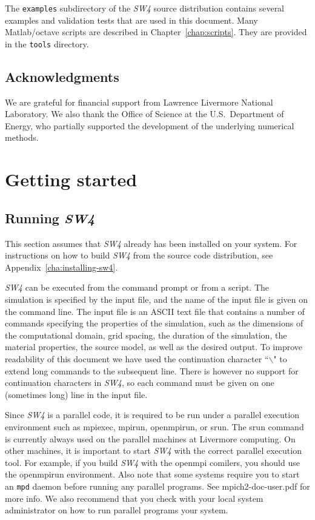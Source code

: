 \documentclass[11pt]{report}
\begin{document}
The {\tt examples} subdirectory of the \emph{SW4} source distribution contains several examples and
validation tests that are used in this document. Many Matlab/octave scripts are described in
Chapter~\ref{chap:scripts}. They are provided in the {\tt tools} directory.

\section*{Acknowledgments} 
We are grateful for financial support from Lawrence Livermore National Laboratory. We also thank
the Office of Science at the U.S.~Department of Energy, who partially supported the development of
the underlying numerical methods.

\chapter{Getting started}

\section{Running \emph{SW4}}
This section assumes that \emph{SW4} already has been installed on your system. For instructions on
how to build \emph{SW4} from the source code distribution, see Appendix~\ref{cha:installing-sw4}.

\emph{SW4} can be executed from the command prompt or from a script. The simulation is specified by
the input file, and the name of the input file is given on the command line. The input file is an
ASCII text file that contains a number of commands specifying the properties of the simulation, such
as the dimensions of the computational domain, grid spacing, the duration of the simulation, the
material properties, the source model, as well as the desired output. To improve readability of this
document we have used the continuation character ``$\backslash$" to extend long commands to the
subsequent line. There is however no support for continuation characters in \emph{SW4}, so each
command must be given on one (sometimes long) line in the input file.

Since \emph{SW4} is a parallel code, it is required to be run under a parallel execution environment
such as mpiexec, mpirun, openmpirun, or srun. The srun command is currently always used on the
parallel machines at Livermore computing. On other machines, it is important to start \emph{SW4}
with the correct parallel execution tool. For example, if you build \emph{SW4} with the openmpi
comilers, you should use the openmpirun environment. Also note that some systems require you to
start an \verb+mpd+ daemon before running any parallel programs. See mpich2-doc-user.pdf for more
info. We also recommend that you check with your local system administrator on how to run parallel
programs your system.
\end{document}
